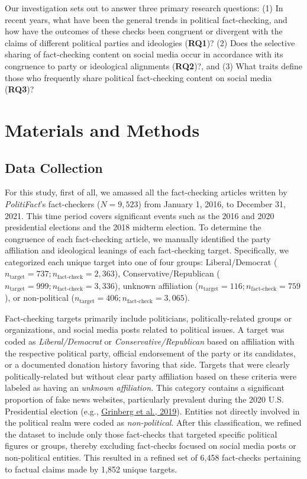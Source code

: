 \documentclass[
  12pt,
]{article}
\begin{document}
Our investigation sets out to answer three primary research questions:
(1) In recent years, what have been the general trends in political
fact-checking, and how have the outcomes of these checks been congruent
or divergent with the claims of different political parties and
ideologies (\textbf{RQ1})? (2) Does the selective sharing of
fact-checking content on social media occur in accordance with its
congruence to party or ideological alignments (\textbf{RQ2})?, and (3)
What traits define those who frequently share political fact-checking
content on social media (\textbf{RQ3})?

\hypertarget{materials-and-methods}{%
\section{Materials and Methods}\label{materials-and-methods}}

\hypertarget{data-collection}{%
\subsection{Data Collection}\label{data-collection}}

For this study, first of all, we amassed all the fact-checking articles
written by \emph{PolitiFact}'s fact-checkers (\(N = 9,523\)) from
January 1, 2016, to December 31, 2021. This time period covers
significant events such as the 2016 and 2020 presidential elections and
the 2018 midterm election. To determine the congruence of each
fact-checking article, we manually identified the party affiliation and
ideological leanings of each fact-checking target. Specifically, we
categorized each unique target into one of four groups: Liberal/Democrat
(\(n_{\text{target}} = 737; n_{\text{fact-check}} = 2,363\)),
Conservative/Republican
(\(n_{\text{target}} = 999; n_{\text{fact-check}} = 3,336\)), unknown
affiliation (\(n_{\text{target}} = 116; n_{\text{fact-check}} = 759\)),
or non-political
(\(n_{\text{target}} = 406; n_{\text{fact-check}} = 3,065\)).

Fact-checking targets primarily include politicians, politically-related
groups or organizations, and social media posts related to political
issues. A target was coded as \emph{Liberal/Democrat} or
\emph{Conservative/Republican} based on affiliation with the respective
political party, official endorsement of the party or its candidates, or
a documented donation history favoring that side. Targets that were
clearly politically-related but without clear party affiliation based on
these criteria were labeled as having an \emph{unknown affiliation.}
This category contains a significant proportion of fake news websites,
particularly prevalent during the 2020 U.S. Presidential election (e.g.,
\protect\hyperlink{ref-grinberg2019fake}{Grinberg et al., 2019}).
Entities not directly involved in the political realm were coded as
\emph{non-political}. After this classification, we refined the dataset
to include only those fact-checks that targeted specific political
figures or groups, thereby excluding fact-checks focused on social media
posts or non-political entities. This resulted in a refined set of 6,458
fact-checks pertaining to factual claims made by 1,852 unique targets.
\end{document}
